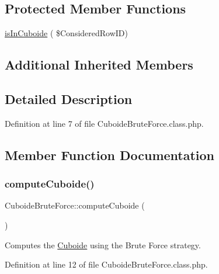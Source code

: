 \subsection*{Protected Member Functions}
\begin{DoxyCompactItemize}
\item 
\hyperlink{class_cuboide_brute_force_a9da022ea3894e5712fdd8f052a15f9b4}{is\+In\+Cuboide} ( \$Considered\+Row\+ID)
\end{DoxyCompactItemize}
\subsection*{Additional Inherited Members}


\subsection{Detailed Description}


Definition at line 7 of file Cuboide\+Brute\+Force.\+class.\+php.



\subsection{Member Function Documentation}
\mbox{\label{class_cuboide_brute_force_a848838a90fadac028d553bb56fa3ee44}} 
\subsubsection{\texorpdfstring{compute\+Cuboide()}{computeCuboide()}}
{\footnotesize\ttfamily Cuboide\+Brute\+Force\+::compute\+Cuboide (\begin{DoxyParamCaption}{ }\end{DoxyParamCaption})}

Computes the \hyperlink{class_cuboide}{Cuboide} using the Brute Force strategy. 

Definition at line 12 of file Cuboide\+Brute\+Force.\+class.\+php.

\mbox{\label{class_cuboide_brute_force_a9da022ea3894e5712fdd8f052a15f9b4}} 
